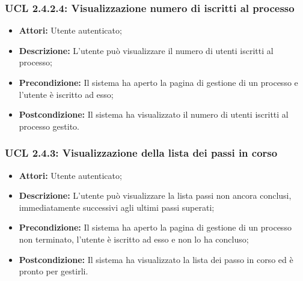\subsubsection{UCL 2.4.2.4: Visualizzazione numero di iscritti al processo}
\begin{itemize}
\item \textbf{Attori:} Utente autenticato;
\item \textbf{Descrizione:} L'utente può visualizzare il numero di utenti iscritti al processo;
\item \textbf{Precondizione:} Il sistema ha aperto la pagina di gestione di un processo e l'utente è iscritto ad esso;
\item \textbf{Postcondizione:} Il sistema ha visualizzato il numero di utenti iscritti al processo gestito.
\end{itemize}

\hypertarget{L2.4.3}{}
\subsubsection{UCL 2.4.3: Visualizzazione della lista dei passi in corso}
\begin{itemize}
\item \textbf{Attori:} Utente autenticato;
\item \textbf{Descrizione:} L'utente può visualizzare la lista passi non ancora conclusi, immediatamente successivi agli ultimi passi superati;
\item \textbf{Precondizione:} Il sistema ha aperto la pagina di gestione di un processo non terminato, l'utente è iscritto ad esso e non lo ha concluso;
\item \textbf{Postcondizione:} Il sistema ha visualizzato la lista dei passo in corso ed è pronto per gestirli.
\end{itemize}

\hypertarget{L2.4.4}{}
